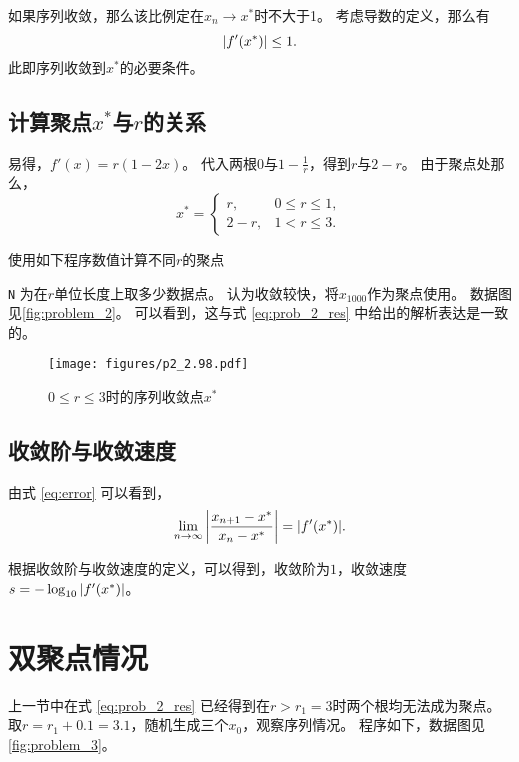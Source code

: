 如果序列收敛，那么该比例定在$x_n\to x^*$时不大于1。
考虑导数的定义，那么有
\begin{equation}
    \qty|f'(x^*)| \le 1.
\end{equation}
此即序列收敛到$x^*$的必要条件。

\subsection{计算聚点\texorpdfstring{$x^*$}{x*}与\texorpdfstring{$r$}{r}的关系}
易得，$f'(x) = r(1-2x)$。
代入两根$0$与$1-\frac{1}{r}$，得到$r$与$2-r$。
由于聚点处那么，
\begin{equation}\label{eq:prob_2_res}
    x^* = \begin{cases}
        r,& 0\le r\le 1,\\
        2-r,&   1<r\le 3.
    \end{cases}
\end{equation}

使用如下程序数值计算不同$r$的聚点
{
    \linespread{1.0}
    
}
\verb|N| 为在$r$单位长度上取多少数据点。
认为收敛较快，将$x_{1000}$作为聚点使用。
数据图见\autoref{fig:problem_2}。
可以看到，这与式 \eqref{eq:prob_2_res} 中给出的解析表达是一致的。

\begin{figure}
    \centering
    \texttt{[image: figures/p2\_2.98.pdf]}
    \caption{$0\le r\le 3$时的序列收敛点$x^*$}
    \label{fig:problem_2}
\end{figure}

\subsection{收敛阶与收敛速度}
由式 \eqref{eq:error} 可以看到，
\begin{equation}\label{eq:conv_speed}
    \lim_{n\to\infty} \qty|\frac{x_{n+1} - x^*}{x_{n} - x^*}| = \qty|f'(x^*)|.
\end{equation}

根据收敛阶与收敛速度的定义，可以得到，收敛阶为$1$，收敛速度$s = -\log_{10}\qty|f'(x^*)|$。

\section{双聚点情况}
上一节中在式 \eqref{eq:prob_2_res} 已经得到在$r>r_1=3$时两个根均无法成为聚点。
取$r=r_1+0.1=3.1$，随机生成三个$x_0$，观察序列情况。
程序如下，数据图见\autoref{fig:problem_3}。
{
    \linespread{1.0}
    
}

